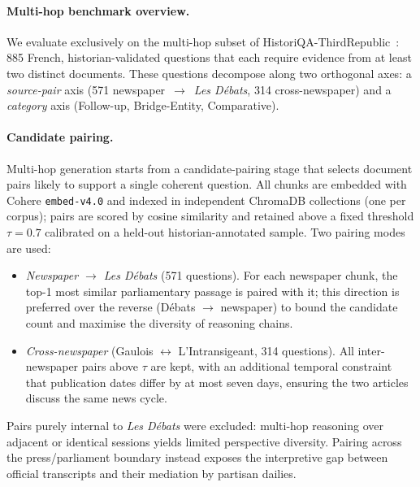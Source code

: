 \paragraph{Multi-hop benchmark overview.}
We evaluate exclusively on the multi-hop subset of
HistoriQA-ThirdRepublic~\cite{historiqa-pellet}: 885 French, historian-validated
questions that each require evidence from at least two distinct
documents. These questions decompose along two orthogonal axes:
a \emph{source-pair} axis (571 newspaper~$\to$~\textit{Les Débats},
314 cross-newspaper) and a \emph{category} axis
(Follow-up, Bridge-Entity, Comparative).

\paragraph{Candidate pairing.}
Multi-hop generation starts from a candidate-pairing stage that selects
document pairs likely to support a single coherent question. All
chunks are embedded with Cohere \texttt{embed-v4.0} and indexed in
independent ChromaDB collections (one per corpus); pairs are scored by
cosine similarity and retained above a fixed threshold $\tau{=}0.7$
calibrated on a held-out historian-annotated sample. Two pairing modes
are used:
\begin{itemize}[leftmargin=1.2em,itemsep=0.15em,topsep=0.25em]
  \item \textit{Newspaper $\to$ Les Débats} (571 questions). For each
    newspaper chunk, the top-1 most similar parliamentary passage is
    paired with it; this direction is preferred over the reverse
    (Débats $\to$ newspaper) to bound the candidate count and maximise
    the diversity of reasoning chains.
  \item \textit{Cross-newspaper} (Gaulois $\leftrightarrow$
    L'Intransigeant, 314 questions). All inter-newspaper pairs above
    $\tau$ are kept, with an additional temporal constraint that
    publication dates differ by at most seven days, ensuring the two
    articles discuss the same news cycle.
\end{itemize}
Pairs purely internal to \textit{Les Débats} were excluded: multi-hop
reasoning over adjacent or identical sessions yields limited
perspective diversity. Pairing across the press/parliament boundary
instead exposes the interpretive gap between official transcripts and
their mediation by partisan dailies.

